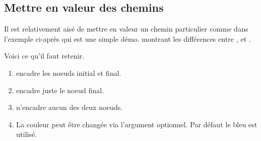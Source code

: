 \documentclass[12pt,a4paper]{article}
\begin{document}

\subsection{Mettre en valeur des chemins}

Il est relativement aisé de mettre en valeur un chemin particulier comme dans l'exemple ci-après qui est une simple démo. montrant les différences entre ,   et .


Voici ce qu'il faut retenir.

\begin{enumerate}
	\item {} encadre les noeuds initial et final.

	\item {} encadre juste le noeud final.

	\item {} n'encadre aucun des deux noeuds.
	
	\item La couleur peut être changée via l'argument optionnel. Par défaut le bleu est utilisé.
\end{enumerate}
\end{document}
